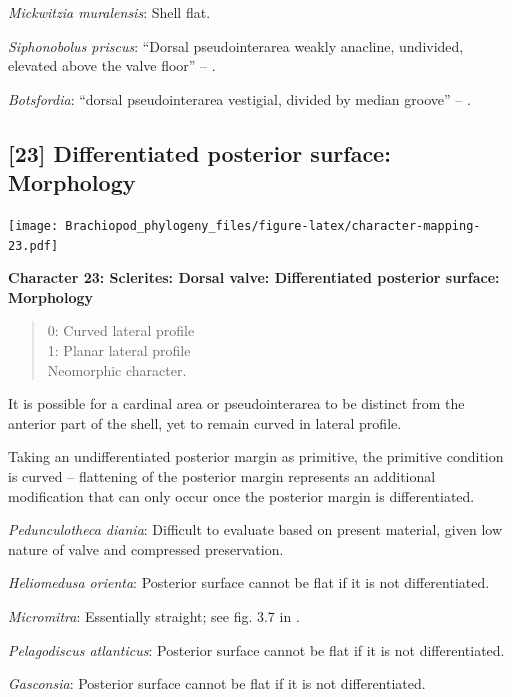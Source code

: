 \documentclass[]{book}
\theoremstyle{definition}
\theoremstyle{definition}
\theoremstyle{definition}
\theoremstyle{remark}
\begin{document}
\emph{Mickwitzia muralensis}: Shell flat.

\emph{Siphonobolus priscus}: ``Dorsal pseudointerarea weakly anacline,
undivided, elevated above the valve floor'' --
\citet{Popov2009Earlyontogeny}.

\emph{Botsfordia}: ``dorsal pseudointerarea vestigial, divided by median
groove'' -- \citet{Williams2000BrachiopodaLinguliformea}.

\hypertarget{differentiated-posterior-surface-morphology}{%
\subsection*{{[}23{]} Differentiated posterior surface:
Morphology}\label{differentiated-posterior-surface-morphology}}

\texttt{[image: Brachiopod\_phylogeny\_files/figure-latex/character-mapping-23.pdf]}

\textbf{Character 23: Sclerites: Dorsal valve: Differentiated posterior
surface: Morphology}

\begin{quote}
0: Curved lateral profile\\
1: Planar lateral profile\\
Neomorphic character.
\end{quote}

It is possible for a cardinal area or pseudointerarea to be distinct
from the anterior part of the shell, yet to remain curved in lateral
profile.

Taking an undifferentiated posterior margin as primitive, the primitive
condition is curved -- flattening of the posterior margin represents an
additional modification that can only occur once the posterior margin is
differentiated.

\emph{Pedunculotheca diania}: Difficult to evaluate based on present
material, given low nature of valve and compressed preservation.

\emph{Heliomedusa orienta}: Posterior surface cannot be flat if it is
not differentiated.

\emph{Micromitra}: Essentially straight; see fig. 3.7 in
\citet{Ushatinskaya2016Protegulumand}.

\emph{Pelagodiscus atlanticus}: Posterior surface cannot be flat if it
is not differentiated.

\emph{Gasconsia}: Posterior surface cannot be flat if it is not
differentiated.
\end{document}
